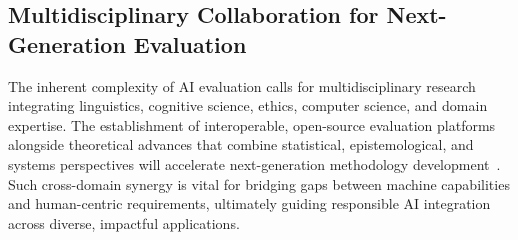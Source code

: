 \documentclass[sigconf]{acmart}
\begin{document}
\subsection{Multidisciplinary Collaboration for Next-Generation Evaluation}

The inherent complexity of AI evaluation calls for multidisciplinary research integrating linguistics, cognitive science, ethics, computer science, and domain expertise. The establishment of interoperable, open-source evaluation platforms alongside theoretical advances that combine statistical, epistemological, and systems perspectives will accelerate next-generation methodology development~\cite{ref35,ref36,ref48,ref49}. Such cross-domain synergy is vital for bridging gaps between machine capabilities and human-centric requirements, ultimately guiding responsible AI integration across diverse, impactful applications.



\end{document}

